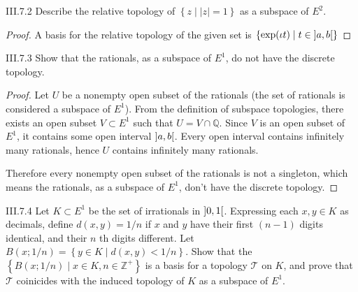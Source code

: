 \begin{problem}{III.7.2}
Describe the relative topology of \( \left\{ z \mid \left\vert{z}\right\vert = 1 \right\} \) as a subspace of \(E^{2}\).
\end{problem}

\begin{proof}
    A basis for the relative topology of the given set is \( \left\{ \exp(\iota t) \mid t \in \left]{a,b}\right[ \right\} \)
\end{proof}

\begin{problem}{III.7.3}
Show that the rationals, as a subspace of \(E^{1}\), do not have the discrete topology.
\end{problem}

\begin{proof}
    Let \(U\) be a nonempty open subset of the rationals (the set of rationals is considered a subspace of \(E^{1}\)). From the definition of subspace topologies, there exists an open subset \(V \subset E^{1}\) such that \(U = V \cap \mathbb{Q}\). Since \(V\) is an open subset of \(E^{1}\), it contains some open interval \(\left]{a, b}\right[\). Every open interval contains infinitely many rationals, hence \(U\) contains infinitely many rationals.

    Therefore every nonempty open subset of the rationals is not a singleton, which means the rationals, as a subspace of \(E^{1}\), don't have the discrete topology.
\end{proof}

\begin{problem}{III.7.4}
Let \(K \subset E^{1}\) be the set of irrationals in \( \left]{0,1}\right[ \). Expressing each \(x, y\in K\) as decimals, define \( d(x, y) = 1/n \) if \(x\) and \(y\) have their first \( (n - 1) \) digits identical, and their \(n\) th digits different. Let \( B(x; 1/n) = \left\{ y \in K \mid d(x, y) < 1/n \right\} \). Show that the \( \left\{ B(x; 1/n) \mid x \in K, n \in \mathbb{Z}^{+} \right\} \) is a basis for a topology \( \mathscr{T} \) on \(K\), and prove that \( \mathscr{T} \) coinicides with the induced topology of \(K\) as a subspace of \(E^{1}\).
\end{problem}

